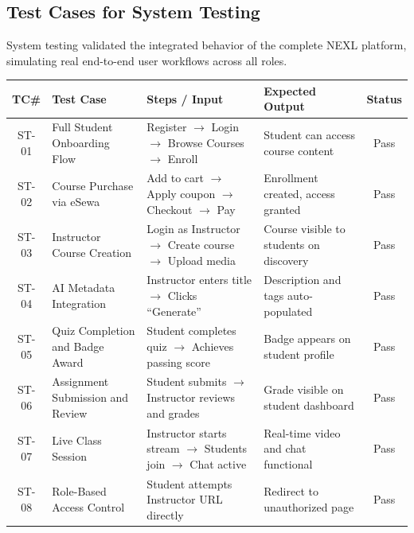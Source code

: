 \subsection{Test Cases for System Testing}

System testing validated the integrated behavior of the complete NEXL platform, simulating real end-to-end user workflows across all roles.

\begin{table}[H]
\centering
\renewcommand{\arraystretch}{1.4}
\begin{tabular}{|c|p{3.5cm}|p{3.5cm}|p{2.5cm}|c|}
\hline
\textbf{TC\#} & \textbf{Test Case} & \textbf{Steps / Input} & \textbf{Expected Output} & \textbf{Status} \\
\hline
ST-01 & Full Student Onboarding Flow         & Register $\rightarrow$ Login $\rightarrow$ Browse Courses $\rightarrow$ Enroll    & Student can access course content        & Pass \\
ST-02 & Course Purchase via eSewa            & Add to cart $\rightarrow$ Apply coupon $\rightarrow$ Checkout $\rightarrow$ Pay   & Enrollment created, access granted       & Pass \\
ST-03 & Instructor Course Creation           & Login as Instructor $\rightarrow$ Create course $\rightarrow$ Upload media         & Course visible to students on discovery  & Pass \\
ST-04 & AI Metadata Integration              & Instructor enters title $\rightarrow$ Clicks ``Generate''                         & Description and tags auto-populated      & Pass \\
ST-05 & Quiz Completion and Badge Award      & Student completes quiz $\rightarrow$ Achieves passing score                       & Badge appears on student profile         & Pass \\
ST-06 & Assignment Submission and Review     & Student submits $\rightarrow$ Instructor reviews and grades                       & Grade visible on student dashboard       & Pass \\
ST-07 & Live Class Session                   & Instructor starts stream $\rightarrow$ Students join $\rightarrow$ Chat active    & Real-time video and chat functional      & Pass \\
ST-08 & Role-Based Access Control            & Student attempts Instructor URL directly                                          & Redirect to unauthorized page            & Pass \\

\end{tabular}
\end{table}

